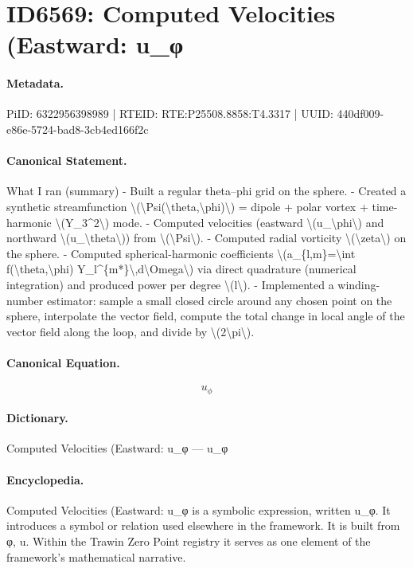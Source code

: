 \section*{ID6569: Computed Velocities (Eastward: u\_φ}
\paragraph{Metadata.}
PiID: 6322956398989 | RTEID: RTE:P25508.8858:T4.3317 | UUID: 440df009-e86e-5724-bad8-3cb4ed166f2c

\paragraph{Canonical Statement.}
What I ran (summary) - Built a regular theta–phi grid on the sphere. - Created a synthetic streamfunction \textbackslash{}(\textbackslash{}Psi(\textbackslash{}theta,\textbackslash{}phi)\textbackslash{}) = dipole + polar vortex + time-harmonic \textbackslash{}(Y\_3\textasciicircum{}2\textbackslash{}) mode. - Computed velocities (eastward \textbackslash{}(u\_\textbackslash{}phi\textbackslash{}) and northward \textbackslash{}(u\_\textbackslash{}theta\textbackslash{})) from \textbackslash{}(\textbackslash{}Psi\textbackslash{}). - Computed radial vorticity \textbackslash{}(\textbackslash{}zeta\textbackslash{}) on the sphere. - Computed spherical-harmonic coefficients \textbackslash{}(a\_\{l,m\}=\textbackslash{}int f(\textbackslash{}theta,\textbackslash{}phi) Y\_l\textasciicircum{}\{m*\}\textbackslash{},d\textbackslash{}Omega\textbackslash{}) via direct quadrature (numerical integration) and produced power per degree \textbackslash{}(l\textbackslash{}). - Implemented a winding-number estimator: sample a small closed circle around any chosen point on the sphere, interpolate the vector field, compute the total change in local angle of the vector field along the loop, and divide by \textbackslash{}(2\textbackslash{}pi\textbackslash{}).

\paragraph{Canonical Equation.}
\[
u_\phi
\]

\paragraph{Dictionary.}
Computed Velocities (Eastward: u\_φ — u\_φ

\paragraph{Encyclopedia.}
Computed Velocities (Eastward: u\_φ is a symbolic expression, written u\_φ. It introduces a symbol or relation used elsewhere in the framework. It is built from φ, u. Within the Trawin Zero Point registry it serves as one element of the framework's mathematical narrative.
